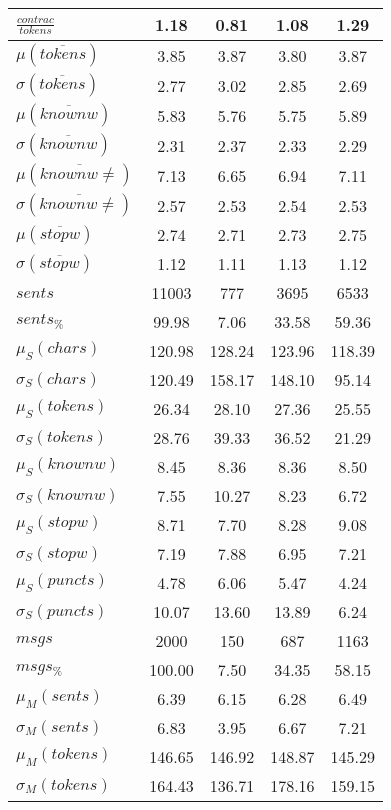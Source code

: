 \begin{table}[h!]
\begin{center}
\begin{tabular}{| l || c | c | c | c |}
$\frac{contrac}{tokens}$ & 1.18  & 0.81  & 1.08  & 1.29 \\\hline\hline
$\mu(\overline{tokens})$ & 3.85  & 3.87  & 3.80  & 3.87 \\
$\sigma(\overline{tokens})$ & 2.77  & 3.02  & 2.85  & 2.69 \\\hline
$\mu(\overline{knownw})$ & 5.83  & 5.76  & 5.75  & 5.89 \\
$\sigma(\overline{knownw})$ & 2.31  & 2.37  & 2.33  & 2.29 \\\hline
$\mu(\overline{knownw \neq})$ & 7.13  & 6.65  & 6.94  & 7.11 \\
$\sigma(\overline{knownw \neq})$ & 2.57  & 2.53  & 2.54  & 2.53 \\\hline
$\mu(\overline{stopw})$ & 2.74  & 2.71  & 2.73  & 2.75 \\
$\sigma(\overline{stopw})$ & 1.12  & 1.11  & 1.13  & 1.12 \\\hline\hline
$sents$ & 11003  & 777  & 3695  & 6533 \\
$sents_{\%}$ & 99.98  & 7.06  & 33.58  & 59.36 \\\hline
$\mu_S(chars)$ & 120.98  & 128.24  & 123.96  & 118.39 \\
$\sigma_S(chars)$ & 120.49  & 158.17  & 148.10  & 95.14 \\\hline
$\mu_S(tokens)$ & 26.34  & 28.10  & 27.36  & 25.55 \\
$\sigma_S(tokens)$ & 28.76  & 39.33  & 36.52  & 21.29 \\\hline
$\mu_S(knownw)$ & 8.45  & 8.36  & 8.36  & 8.50 \\
$\sigma_S(knownw)$ & 7.55  & 10.27  & 8.23  & 6.72 \\\hline
$\mu_S(stopw)$ & 8.71  & 7.70  & 8.28  & 9.08 \\
$\sigma_S(stopw)$ & 7.19  & 7.88  & 6.95  & 7.21 \\\hline
$\mu_S(puncts)$ & 4.78  & 6.06  & 5.47  & 4.24 \\
$\sigma_S(puncts)$ & 10.07  & 13.60  & 13.89  & 6.24 \\\hline\hline
$msgs$ & 2000  & 150  & 687  & 1163 \\
$msgs_{\%}$ & 100.00  & 7.50  & 34.35  & 58.15 \\\hline
$\mu_M(sents)$ & 6.39  & 6.15  & 6.28  & 6.49 \\
$\sigma_M(sents)$ & 6.83  & 3.95  & 6.67  & 7.21 \\\hline
$\mu_M(tokens)$ & 146.65  & 146.92  & 148.87  & 145.29 \\
$\sigma_M(tokens)$ & 164.43  & 136.71  & 178.16  & 159.15 \\\hline

\end{tabular}
\end{center}
\end{table}

